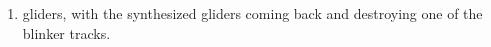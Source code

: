 \begin{multicols}{2}
\begin{problem}
\begin{enumerate}[label=\bf\color{ocre}(\alph*)]
			\item gliders, with the synthesized gliders coming back and destroying one of the blinker tracks.
		\end{enumerate}
	\end{problem}

\end{multicols}
